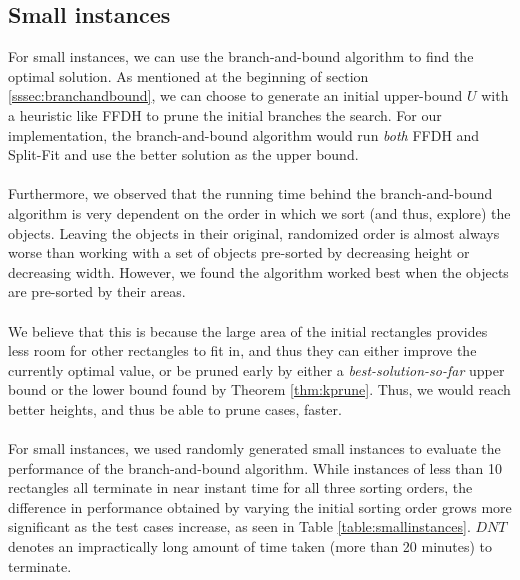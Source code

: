 \documentclass{article}
\begin{document}
\subsection{Small instances}
For small instances, we can use the branch-and-bound algorithm to find the optimal solution. As mentioned at the beginning of section \ref{sssec:branchandbound}, we can choose to generate an initial upper-bound $U$ with a heuristic like FFDH to prune the initial branches the search. For our implementation, the branch-and-bound algorithm would run \textit{both} FFDH and Split-Fit and use the better solution as the upper bound.\\
\\
Furthermore, we observed that the running time behind the branch-and-bound algorithm is very dependent on the order in which we sort (and thus, explore) the objects. Leaving the objects in their original, randomized order is almost always worse than working with a set of objects pre-sorted by decreasing height or decreasing width. However, we found the algorithm worked best when the objects are pre-sorted by their areas.\\
\\
We believe that this is because the large area of the initial rectangles provides less room for other rectangles to fit in, and thus they can either improve the currently optimal value, or be pruned early by either a \textit{best-solution-so-far} upper bound or the lower bound found by Theorem \ref{thm:kprune}. Thus, we would reach better heights, and thus be able to prune cases, faster.\\
\\
For small instances, we used randomly generated small instances to evaluate the performance of the branch-and-bound algorithm. While instances of less than 10 rectangles all terminate in near instant time for all three sorting orders, the difference in performance obtained by varying the initial sorting order grows more significant as the test cases increase, as seen in Table \ref{table:smallinstances}. $DNT$ denotes an impractically long amount of time taken (more than 20 minutes) to terminate.
\end{document}
